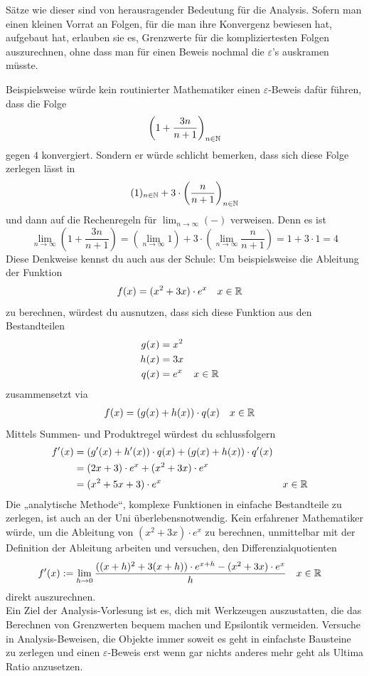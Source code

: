 \begin{bem}
    Sätze wie dieser sind von herausragender Bedeutung für die Analysis. Sofern man einen kleinen Vorrat an Folgen, für die man ihre Konvergenz bewiesen hat, aufgebaut hat, erlauben sie es, Grenzwerte für die kompliziertesten Folgen auszurechnen, ohne dass man für einen Beweis nochmal die $\varepsilon$'s auskramen müsste.
    
    Beispielsweise würde kein routinierter Mathematiker einen $\varepsilon$-Beweis dafür führen, dass die Folge
        \[ \left( 1 + \frac{3n}{n+1} \right)_{n\in \mathbb N} \]
    gegen $4$ konvergiert. Sondern er würde schlicht bemerken, dass sich diese Folge zerlegen lässt in
        \[ (1)_{n\in \mathbb N} + 3\cdot \left(\frac{n}{n+1}\right)_{n\in \mathbb N} \]
    und dann auf die Rechenregeln für $\lim_{n\to\infty}(-)$ verweisen. Denn es ist
        \[ \lim_{n\to \infty} \left( 1+ \frac{3n}{n+1} \right) = \left( \lim_{n\to \infty} 1 \right)+3\cdot \left( \lim_{n\to \infty} \frac{n}{n+1} \right) = 1+3\cdot 1 = 4 \]
    Diese Denkweise kennst du auch aus der Schule: Um beispielsweise die Ableitung der Funktion
    \begin{align*}
        f(x) &= (x^2+3x)\cdot e^x && x\in \mathbb R
    \end{align*}
    zu berechnen, würdest du ausnutzen, dass sich diese Funktion aus den Bestandteilen
    \begin{align*}
        g(x)& = x^2 \\
        h(x) & = 3x \\
        q(x) &= e^x && x\in \mathbb R
    \end{align*}
    zusammensetzt via
    \begin{align*}
        f(x) & = (g(x)+h(x))\cdot q(x) && x\in \mathbb R
    \end{align*}
    Mittels Summen- und Produktregel würdest du schlussfolgern
    \begin{align*}
        f'(x) & = (g'(x)+h'(x))\cdot q(x)  + (g(x)+h(x))\cdot q'(x) \\
        & = (2x+3)\cdot e^x + (x^2+3x)\cdot e^x \\
        & = (x^2+5x+3)\cdot e^x && x\in \mathbb R
    \end{align*}
    Die „analytische Methode“, komplexe Funktionen in einfache Bestandteile zu zerlegen, ist auch an der Uni überlebensnotwendig. Kein erfahrener Mathematiker würde, um die Ableitung von $(x^2+3x)\cdot e^x$ zu berechnen, unmittelbar mit der Definition der Ableitung arbeiten und versuchen, den Differenzialquotienten
    \begin{align*}
        f'(x)&:=\lim_{h\to 0} \frac{((x+h)^2+3(x+h))\cdot e^{x+h} - (x^2+3x)\cdot e^{x}}{h} && x\in \mathbb R
    \end{align*}
    direkt auszurechnen. \\[0.5em]
    Ein Ziel der Analysis-Vorlesung ist es, dich mit Werkzeugen auszustatten, die das Berechnen von Grenzwerten bequem machen und Epsilontik vermeiden. Versuche in Analysis-Beweisen, die Objekte immer soweit es geht in einfachste Bausteine zu zerlegen und einen $\varepsilon$-Beweis erst wenn gar nichts anderes mehr geht als Ultima Ratio anzusetzen.
\end{bem}


